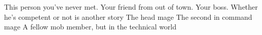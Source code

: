 \documentclass[char]{guildcamp3}
\begin{document}
\begin{contacts}
  \contact{\cNPC{}} This person you've never met.
  \contact{\cSomeGuy{}} Your friend from out of town.
  \contact{\cNobleOne{}} Your boss. Whether he's competent or not is another story
  \contact{\cMageOne{}} The head mage
  \contact{\cMageTwo{}} The second in command mage
  \contact{\cSciOne{}} A fellow mob member, but in the technical world
\end{contacts}
\end{document}
